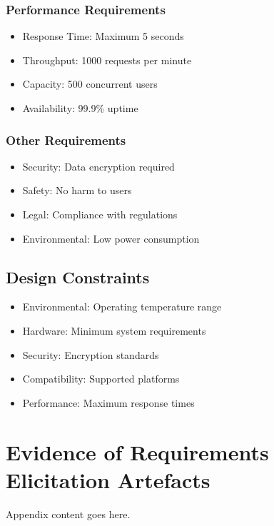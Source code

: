 \documentclass[oneside]{utmsrs}
\begin{document}
\subsection{Performance Requirements}
\begin{itemize}
    \item Response Time: Maximum 5 seconds
    \item Throughput: 1000 requests per minute
    \item Capacity: 500 concurrent users
    \item Availability: 99.9\% uptime
\end{itemize}

\subsection{Other Requirements}
\begin{itemize}
    \item Security: Data encryption required
    \item Safety: No harm to users
    \item Legal: Compliance with regulations
    \item Environmental: Low power consumption
\end{itemize}

\section{Design Constraints}
\begin{itemize}
    \item Environmental: Operating temperature range
    \item Hardware: Minimum system requirements
    \item Security: Encryption standards
    \item Compatibility: Supported platforms
    \item Performance: Maximum response times
\end{itemize}

\appendix
\chapter{Evidence of Requirements Elicitation Artefacts}
Appendix content goes here.
\end{document}
